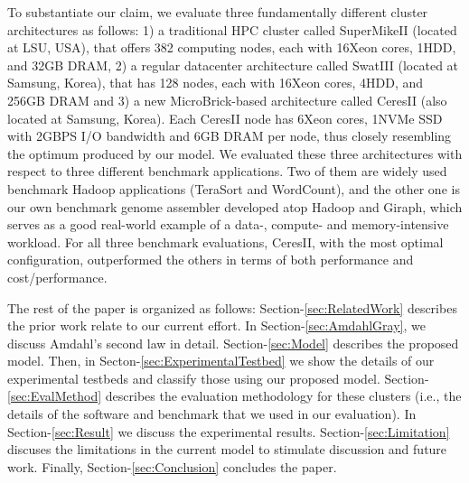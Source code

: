\documentclass[journal]{IEEEtran}
\begin{document}

To substantiate our claim, we evaluate three fundamentally different cluster architectures as follows: 1) a traditional HPC cluster called SuperMikeII (located at LSU, USA), that offers 382 computing nodes, each with 16Xeon cores, 1HDD, and 32GB DRAM, 2) a regular datacenter architecture called SwatIII (located at Samsung, Korea), that has 128 nodes, each with 16Xeon cores, 4HDD, and 256GB DRAM and 3) a new MicroBrick-based architecture called CeresII (also located at Samsung, Korea). Each CeresII node has  6Xeon cores, 1NVMe SSD  with 2GBPS I/O bandwidth and 6GB DRAM per node, thus closely resembling the optimum produced by our model. We evaluated these three architectures with respect to three different benchmark applications. Two of them are widely  used benchmark Hadoop applications (TeraSort and WordCount), and the other one is our own benchmark genome assembler developed atop Hadoop and Giraph, which serves as a good real-world example of a data-, compute- and memory-intensive workload. For all three benchmark evaluations, CeresII, with the most optimal configuration, outperformed the others in terms of both performance and cost/performance. %

The rest of the paper is organized as follows: Section-\ref{sec:RelatedWork} describes the prior work relate to our current effort. In Section-\ref{sec:AmdahlGray}, we discuss Amdahl's second law in detail. Section-\ref{sec:Model} describes the proposed model. Then, in Secton-\ref{sec:ExperimentalTestbed} we show the details of our experimental testbeds and classify those using our proposed model. Section-\ref{sec:EvalMethod} describes the evaluation methodology for these clusters (i.e., the details of the software and benchmark that we used in our evaluation). In Section-\ref{sec:Result} we discuss the experimental results. Section-\ref{sec:Limitation} discuses the limitations in the current model to stimulate discussion and future work. Finally, Section-\ref{sec:Conclusion} concludes the paper.
\end{document}
